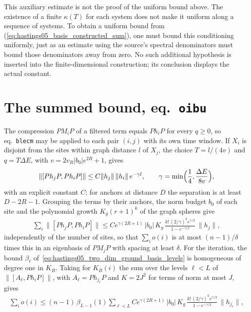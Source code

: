 \documentclass{article}
\begin{document}
This auxiliary estimate is not the proof of the uniform bound above. The
existence of a finite $\kappa(T)$ for each system does not make it uniform
along a sequence of systems. To obtain a uniform bound from
(\ref{eq:hastings05_basis_constructed_sum}), one must bound this conditioning
uniformly, just as an estimate using the source's spectral denominators must
bound those denominators away from zero. No such additional hypothesis is
inserted into the finite-dimensional construction; its conclusion displays the
actual constant.

\section{The summed bound, eq.~\texttt{oibu}}

The compression $PM_iP$ of a filtered term equals $Ph_iP$ for every $q\ge0$, so
eq.~\texttt{blecm} may be applied to each pair $(i,j)$ with its own time
window. If $X_i$ is disjoint from the sites within graph distance $l$ of $X_j$,
the choice $T=l/(4v)$ and $q=T\Delta E$, with $v=2v_R|b_0|e^{2R}+1$, gives
\begin{align}
  \lVert[Ph_jP,Ph_iP]\rVert\le C\lVert h_j\rVert\,\lVert h_i\rVert\,e^{-\gamma l},
  \qquad \gamma=\min\Bigl(\frac14,\frac{\Delta E}{8v}\Bigr),
  \label{eq:hastings05_two_dim_ground_basis_blecm_exp}
\end{align}
with an explicit constant $C$; for anchors at distance $D$ the separation is
at least $D-2R-1$. Grouping the terms by their anchors, the norm budget $b_0$
of each site and the polynomial growth $K_g(r+1)^k$ of the graph spheres give
\begin{align}
  \sum_i\lVert[Ph_jP,Ph_iP]\rVert
  \le Ce^{\gamma(2R+1)}\,|b_0|\,K_g\,
    \frac{k!\,(2/\gamma)^ke^{\gamma/2}}{1-e^{-\gamma/2}}\,\lVert h_j\rVert,
  \label{eq:hastings05_two_dim_ground_basis_oibu}
\end{align}
independently of the number of sites, so that $\sum_io(i)$ is at most $(n-1)/\delta$
times this in an eigenbasis of $PM_jP$ with spacing at least $\delta$.
For the iteration, the bound $\beta_\ell$ of~\eqref{eq:hastings05_two_dim_ground_basis_levels}
is homogeneous of degree one in $K_B$. Taking for $K_B(i)$ the sum over the
levels $\ell<L$ of $\lVert[A_\ell,Ph_iP]\rVert$, with $A_\ell=Ph_{j_\ell}P$ and
$K=2J^2$ for terms of norm at most $J$, gives
\begin{align}
  \sum_io(i)\le(n-1)\,\beta_{L-1}(1)\sum_{\ell<L}Ce^{\gamma(2R+1)}\,|b_0|\,K_g\,
    \frac{k!\,(2/\gamma)^ke^{\gamma/2}}{1-e^{-\gamma/2}}\,\lVert h_{j_\ell}\rVert,
  \label{eq:hastings05_two_dim_ground_basis_oibu_levels}
\end{align}
\end{document}
